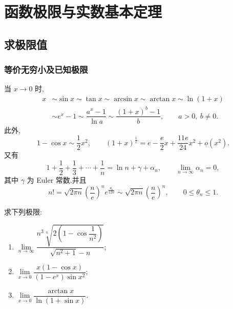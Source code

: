 \setcounter{chapter}{1}
\pagestyle{fancy}

\chapter{函数极限与实数基本定理}


\section{求极限值}


\subsection{等价无穷小及已知极限}

\begin{proposition}
    当 $x\to0$ 时,
    \[
        \begin{aligned}
            x & \sim\sin x\sim\tan x\sim\arcsin x\sim\arctan x\sim\ln(1+x) \\
              & \sim e^x-1
            \sim\dfrac{a^x-1}{\ln a}
            \sim\dfrac{(1+x)^b-1}{b},
            \qquad a>0,\ b\neq0.
        \end{aligned}
    \]
    此外,
    \[
        1-\cos x\sim\dfrac{1}{2}x^2,
        \qquad
        (1+x)^{\frac{1}{x}}
        =e-\dfrac{e}{2}x+\dfrac{11e}{24}x^2+o(x^2).
    \]
    又有
    \[
        1+\dfrac{1}{2}+\dfrac{1}{3}+\cdots+\dfrac{1}{n}
        =\ln n+\gamma+\alpha_n,
        \qquad
        \lim\limits_{n\to\infty}\alpha_n=0,
    \]
    其中 $\gamma$ 为 Euler 常数.并且
    \[
        n!=\sqrt{2\pi n}\left(\dfrac{n}{e}\right)^n
        e^{\frac{\theta_n}{12n}}
        \sim
        \sqrt{2\pi n}\left(\dfrac{n}{e}\right)^n,
        \qquad 0\leq\theta_n\leq1.
    \]
\end{proposition}

\begin{example}
    求下列极限:
    \begin{enumerate}
        \item $\displaystyle
                  \lim\limits_{n\to\infty}
                  \dfrac{n^3\sqrt[n]{2\left(1-\cos\dfrac{1}{n^2}\right)}}{\sqrt{n^2+1}-n}$;
        \item $\displaystyle
                  \lim\limits_{x\to0}
                  \dfrac{x(1-\cos x)}{(1-e^x)\sin x^2}$;
        \item $\displaystyle
                  \lim\limits_{x\to0}
                  \dfrac{\arctan x}{\ln(1+\sin x)}$.
    \end{enumerate}
\end{example}
\exampleblank

